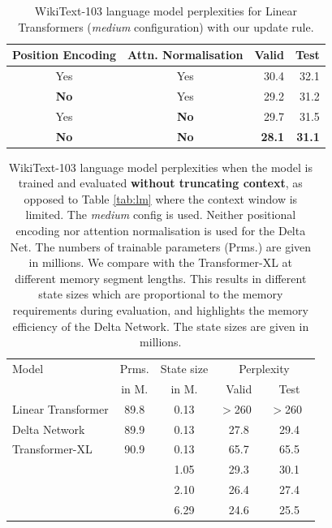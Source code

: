 \documentclass{article}
\theoremstyle{definition}
\begin{document}
\begin{table}[h]
\caption{
WikiText-103 language model perplexities
for Linear Transformers (\textit{medium} configuration) with our update rule.
}

\label{tab:lm-ablation}
\vskip 0.15in
\begin{center}
\begin{small}
\begin{tabular}{ccrr}
\toprule
Position Encoding  & Attn. Normalisation  & Valid & Test \\ \midrule
Yes  & Yes   &  30.4   &  32.1   \\ 
\textbf{No}   & Yes   &  29.2   &  31.2   \\ 
Yes  &  \textbf{No}   &  29.7   &  31.5  \\ 
\textbf{No}   &  \textbf{No}   &  \textbf{28.1}   &  \textbf{31.1} \\
\bottomrule
\end{tabular}
\end{small}
\end{center}
\vskip -0.2in

\end{table}

\begin{table}[t]
\caption{
WikiText-103 language model perplexities
when the model is trained and evaluated \textbf{without truncating context},
as opposed to Table \ref{tab:lm} where the context window is limited.
The \textit{medium} config is used.
Neither positional encoding nor attention normalisation
is used for the Delta Net.
The numbers of trainable parameters (Prms.) are given in millions.
We compare with the Transformer-XL at different memory segment lengths.
This results in different state sizes which are proportional to the memory requirements during evaluation,
and highlights the memory efficiency of the Delta Network. 
The state sizes are given in millions.
}
\label{tab:lm-cco}
\vskip 0.15in
\begin{center}
\setlength{\tabcolsep}{0.4em}
\begin{small}
\begin{tabular}{lcccc}
\toprule
Model & Prms.  & State size & \multicolumn{2}{c}{Perplexity}   \vspace{1mm} \\ 
 &  in M. & in M. & Valid & Test   \\ \midrule
Linear Transformer      & 89.8 & 0.13  &  $>$260 $\;$  & $>$260 $\;$ \\
Delta Network  & 89.9 & 0.13 &  27.8   & 29.4  \\  
\midrule
Transformer-XL & 90.9 & 0.13 &  65.7  & 65.5   \\

&  &  1.05 & 29.3  & 30.1  \\ 
& & 2.10  &  26.4  & 27.4  \\  
& & 6.29 &  24.6  & 25.5  \\

\bottomrule
\end{tabular}
\end{small}
\end{center}
\vskip -0.1in

\end{table}
\end{document}
